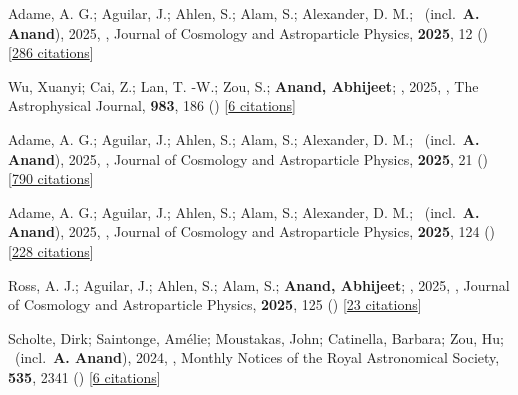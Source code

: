 \item[{\color{numcolor}\scriptsize16}] Adame, A. G.; Aguilar, J.; Ahlen, S.; Alam, S.; Alexander, D. M.; \etal\ (incl.\ \textbf{A. Anand}), 2025, , Journal of Cosmology and Astroparticle Physics, \textbf{2025}, 12 () [\href{https://ui.adsabs.harvard.edu/abs/2025JCAP...04..012A}{286 citations}]

\item[{\color{numcolor}\scriptsize15}] Wu, Xuanyi; Cai, Z.; Lan, T. -W.; Zou, S.; \textbf{Anand, Abhijeet}; \etal, 2025, , The Astrophysical Journal, \textbf{983}, 186 () [\href{https://ui.adsabs.harvard.edu/abs/2025ApJ...983..186W}{6 citations}]

\item[{\color{numcolor}\scriptsize14}] Adame, A. G.; Aguilar, J.; Ahlen, S.; Alam, S.; Alexander, D. M.; \etal\ (incl.\ \textbf{A. Anand}), 2025, , Journal of Cosmology and Astroparticle Physics, \textbf{2025}, 21 () [\href{https://ui.adsabs.harvard.edu/abs/2025JCAP...02..021A}{790 citations}]

\item[{\color{numcolor}\scriptsize13}] Adame, A. G.; Aguilar, J.; Ahlen, S.; Alam, S.; Alexander, D. M.; \etal\ (incl.\ \textbf{A. Anand}), 2025, , Journal of Cosmology and Astroparticle Physics, \textbf{2025}, 124 () [\href{https://ui.adsabs.harvard.edu/abs/2025JCAP...01..124A}{228 citations}]

\item[{\color{numcolor}\scriptsize12}] Ross, A. J.; Aguilar, J.; Ahlen, S.; Alam, S.; \textbf{Anand, Abhijeet}; \etal, 2025, , Journal of Cosmology and Astroparticle Physics, \textbf{2025}, 125 () [\href{https://ui.adsabs.harvard.edu/abs/2025JCAP...01..125R}{23 citations}]

\item[{\color{numcolor}\scriptsize11}] Scholte, Dirk; Saintonge, Am{\'e}lie; Moustakas, John; Catinella, Barbara; Zou, Hu; \etal\ (incl.\ \textbf{A. Anand}), 2024, , Monthly Notices of the Royal Astronomical Society, \textbf{535}, 2341 () [\href{https://ui.adsabs.harvard.edu/abs/2024MNRAS.535.2341S}{6 citations}]

